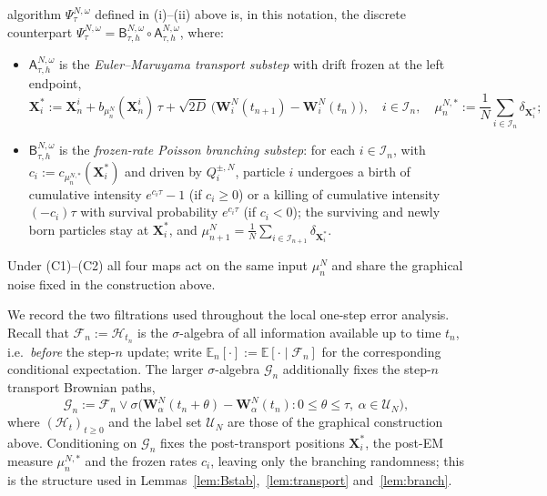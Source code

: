 \documentclass[a4paper,fleqn]{cas-sc}
\theoremstyle{definition}
\theoremstyle{remark}
\begin{document}
algorithm $\Psi^{N,\omega}_\tau$ defined in (i)--(ii) above is, in this notation,
the discrete counterpart
$\Psi^{N,\omega}_\tau=\mathsf B^{N,\omega}_{\tau,h}\circ\mathsf A^{N,\omega}_{\tau,h}$,
where:
\begin{itemize}
\item[(i)] $\mathsf A^{N,\omega}_{\tau,h}$ is the \emph{Euler--Maruyama transport
substep} with drift frozen at the left endpoint,
\[
\mathbf X^*_i
:=\mathbf X^i_n+b_{\mu^N_n}(\mathbf X^i_n)\,\tau
+\sqrt{2D}\,\bigl(\mathbf W^N_i(t_{n+1})-\mathbf W^N_i(t_n)\bigr),
\quad i\in\mathcal I_n,
\quad
\mu^{N,*}_n:=\frac1N\sum_{i\in\mathcal I_n}\delta_{\mathbf X^*_i};
\]
\item[(ii)] $\mathsf B^{N,\omega}_{\tau,h}$ is the \emph{frozen-rate Poisson
branching substep}: for each $i\in\mathcal I_n$, with
$c_i:=c_{\mu^{N,*}_n}(\mathbf X^*_i)$ and driven by $Q^{\pm,N}_i$, particle
$i$ undergoes a birth of cumulative intensity $e^{c_i\tau}-1$ (if $c_i\ge0$) or a
killing of cumulative intensity $(-c_i)\tau$ with survival probability
$e^{c_i\tau}$ (if $c_i<0$); the surviving and newly born particles stay at
$\mathbf X^*_i$, and
$\mu^N_{n+1}=\frac1N\sum_{i\in\mathcal I_{n+1}}\delta_{\mathbf X^*_i}$.
\end{itemize}
Under (C1)--(C2) all four maps act on the same input $\mu^N_n$ and share the
graphical noise fixed in the construction above.

We record the two filtrations used throughout the local one-step error analysis. Recall that
$\mathcal F_n:=\mathcal H_{t_n}$ is the $\sigma$-algebra of all information
available up to time $t_n$, i.e.\ \emph{before} the step-$n$ update;
write $\mathbb E_n[\cdot]:=\mathbb E[\cdot\mid\mathcal F_n]$ for the corresponding
conditional expectation. The larger $\sigma$-algebra
$\mathcal G_n$ additionally fixes the step-$n$ transport Brownian paths,
\begin{equation}\label{eq:filtrations}
\mathcal G_n:=\mathcal F_n\vee\sigma\bigl(\mathbf W^N_\alpha(t_n+\theta)-\mathbf W^N_\alpha(t_n):
0\le\theta\le\tau,\ \alpha\in\mathcal U_N\bigr),
\end{equation}
where $(\mathcal H_t)_{t\ge0}$ and the label set $\mathcal U_N$ are those of the
graphical construction above. Conditioning on $\mathcal G_n$ fixes the
post-transport positions $\mathbf X^*_i$, the post-EM measure $\mu^{N,*}_n$ and
the frozen rates $c_i$, leaving only the branching randomness; this is the
structure used in Lemmas~\ref{lem:Bstab},~\ref{lem:transport}
and~\ref{lem:branch}.
\end{document}
